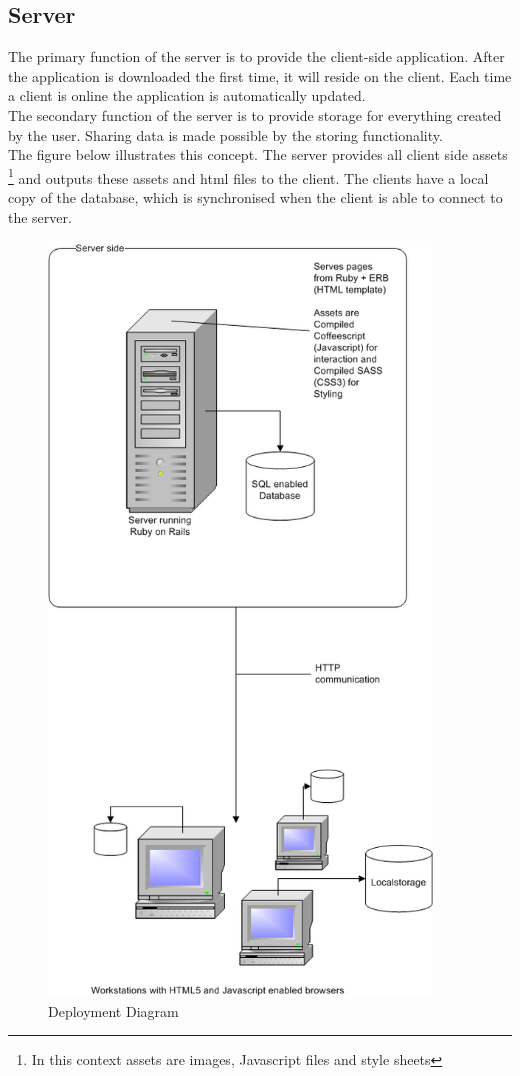 \documentclass{report}
\begin{document}
			\subsection{Server}
				The primary function of the server is to provide the client-side application. After the application is downloaded the first time, it will reside on the client. Each time a client is online the application is automatically updated. \\
				The secondary function of the server is to provide storage for everything created by the user. Sharing data is made possible by the storing functionality. \\
				The figure below illustrates this concept. The server provides all client side assets \footnote{In this context assets are images, Javascript files and style sheets} and outputs these assets and html files to the client. The clients have a local copy of the database, which is synchronised when the client is able to connect to the server.
				\clearpage
				\begin{figure}[htb]
					\begin{center}
						\includegraphics[height=20cm,keepaspectratio=true]{EAD.png}
						\caption{Deployment Diagram}
						\label{fig: EAD}
					\end{center}
				\end{figure}
				\clearpage
									
\end{document}
